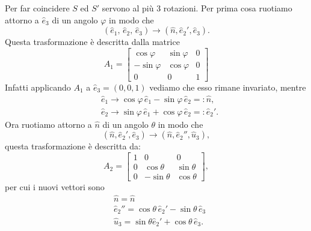     Per far coincidere $S$ ed $S'$ servono al più 3 rotazioni. Per prima cosa ruotiamo attorno a $\hat{e}_3$ di un angolo $\varphi$ in modo che 
    \begin{equation}
        (\hat{e}_1,\,\hat{e}_2,\,\hat{e}_3) \to (\hat{n},\hat{e}_2', \hat{e}_3).
    \end{equation}
    Questa trasformazione è descritta dalla matrice
    \begin{equation}
        A_1 = \begin{bmatrix}
            \cos \varphi & \sin \varphi & 0\\
            -\sin \varphi &\cos \varphi & 0 \\
            0 & 0 & 1
        \end{bmatrix}
    \end{equation}
    Infatti applicando $A_1$ a $\hat{e}_3=(0,0,1)$ vediamo che esso rimane invariato, mentre
    \begin{equation}
    \begin{aligned}
    &\hat{e}_1 \to  \cos \varphi \,\hat{e}_1 -\sin \varphi \,\hat{e}_2  =: \hat{n},\\
    &\hat{e}_2 \to \sin \varphi\,\hat{e}_1 +\cos \varphi\,\hat{e}_2 =: \hat{e}_2'.
    \end{aligned}
    \end{equation}
    Ora ruotiamo attorno a $\hat{n}$ di un angolo $\theta$ in modo che
    \begin{equation}
        (\hat{n},\hat{e}_2', \hat{e}_3) \to (\hat{n}, \hat{e}_2'', \hat{u}_3),
    \end{equation}
    questa trasformazione è descritta da:
    \begin{equation}
        A_2 = 
        \begin{bmatrix}
            1 & 0 & 0\\
            0 & \cos \theta & \sin \theta \\
            0 & -\sin \theta & \cos \theta
        \end{bmatrix}, 
    \end{equation}
    per cui i nuovi vettori sono
    \begin{equation}
    \begin{aligned}
        & \hat{n} = \hat{n}\\
        &\hat{e}_2'' = \cos \theta \,\hat{e}_2' -\sin \theta \,\hat{e}_3\\
        & \hat{u}_3 = \sin \theta \hat{e}_2'+\cos \theta \,\hat{e}_3.
    \end{aligned}
    \end{equation}
